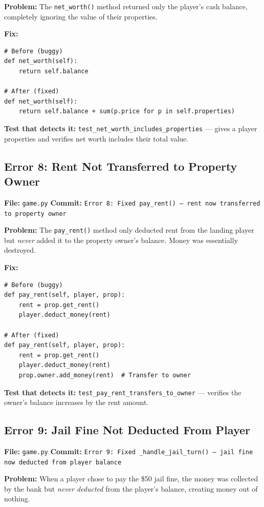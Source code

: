 \documentclass[12pt,a4paper]{article}
\begin{document}
\textbf{Problem:} The \texttt{net\_worth()} method returned only the player's cash balance, completely ignoring the value of their properties.

\textbf{Fix:}
\begin{lstlisting}
# Before (buggy)
def net_worth(self):
    return self.balance

# After (fixed)
def net_worth(self):
    return self.balance + sum(p.price for p in self.properties)
\end{lstlisting}

\textbf{Test that detects it:} \texttt{test\_net\_worth\_includes\_properties} --- gives a player properties and verifies net worth includes their total value.


\subsection{Error 8: Rent Not Transferred to Property Owner}
\textbf{File:} \texttt{game.py} \quad \textbf{Commit:} \texttt{Error 8: Fixed pay\_rent() --- rent now transferred to property owner}

\textbf{Problem:} The \texttt{pay\_rent()} method only deducted rent from the landing player but \textit{never} added it to the property owner's balance. Money was essentially destroyed.

\textbf{Fix:}
\begin{lstlisting}
# Before (buggy)
def pay_rent(self, player, prop):
    rent = prop.get_rent()
    player.deduct_money(rent)

# After (fixed)
def pay_rent(self, player, prop):
    rent = prop.get_rent()
    player.deduct_money(rent)
    prop.owner.add_money(rent)  # Transfer to owner
\end{lstlisting}

\textbf{Test that detects it:} \texttt{test\_pay\_rent\_transfers\_to\_owner} --- verifies the owner's balance increases by the rent amount.


\subsection{Error 9: Jail Fine Not Deducted From Player}
\textbf{File:} \texttt{game.py} \quad \textbf{Commit:} \texttt{Error 9: Fixed \_handle\_jail\_turn() --- jail fine now deducted from player balance}

\textbf{Problem:} When a player chose to pay the \$50 jail fine, the money was collected by the bank but \textit{never deducted} from the player's balance, creating money out of nothing.
\end{document}
